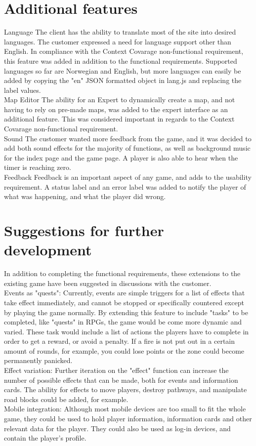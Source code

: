 \section{Additional features}

Language
The client has the ability to translate most of the site into desired languages. The customer expressed a need for language support other than English. In compliance with the Context Covarage non-functional requirement, this feature was added in addition to the functional requirements. Supported languages so far are Norwegian and English, but more languages can easily be added by copying the "en" JSON formatted object in lang.js and replacing the label values.
\\
Map Editor
The ability for an Expert to dynamically create a map, and not having to rely on pre-made maps, was added to the expert interface as an additional feature. This was considered important in regards to the Context Covarage non-functional requirement.
\\
Sound
The customer wanted more feedback from the game, and it was decided to add both sound effects for the majority of functions, as well as background music for the index page and the game page. A player is also able to hear when the timer is reaching zero.
\\
Feedback
Feedback is an important aspect of any game, and adds to the usability requirement. A status label and an error label was added to notify the player of what was happening, and what the player did wrong. 

\section{Suggestions for further development}

In addition to completing the functional requirements, these extensions to the existing game have been suggested in discussions with the customer.
\\
Events as "quests":
Currently, events are simple triggers for a list of effects that take effect immediately, and cannot be stopped or specifically countered except by playing the game normally. By extending this feature to include "tasks" to be completed, like "quests" in RPGs, the game would be come more dynamic and varied. These task would include a list of actions the players have to complete in order to get a reward, or avoid a penalty. If a fire is not put out in a certain amount of rounds, for example, you could lose points or the zone could become permanently panicked.
\\
Effect variation:
Further iteration on the "effect" function can increase the number of possible effects that can be made, both for events and information cards. The ability for effects to move players, destroy pathways, and manipulate road blocks could be added, for example.
\\
Mobile integration:
Although most mobile devices are too small to fit the whole game, they could be used to hold player information, information cards and other relevant data for the player. They could also be used as log-in devices, and contain the player's profile.


